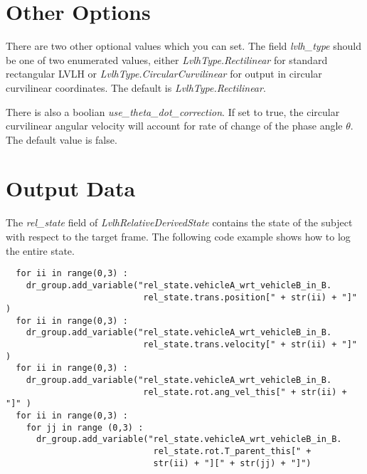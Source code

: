 \section{Other Options}
There are two other optional values which you can set. The field
\textit{lvlh\_type} should be one of two enumerated values, either
\textit{LvlhType.Rectilinear} for standard rectangular LVLH or
\textit{LvlhType.CircularCurvilinear} for output in circular curvilinear
coordinates. The default is \textit{LvlhType.Rectilinear}.

There is also a boolian \textit{use\_theta\_dot\_correction}. If set to true,
the circular curvilinear angular velocity will account for rate of change of
the phase angle $\theta$. The default value is false.
\section{Output Data}
The \textit{rel\_state} field of \textit{LvlhRelativeDerivedState} contains
the state of the subject with respect to the target frame. The following code
example shows how to log the entire state.
\begin{verbatim}
  for ii in range(0,3) :
    dr_group.add_variable("rel_state.vehicleA_wrt_vehicleB_in_B.
                           rel_state.trans.position[" + str(ii) + "]" )
  for ii in range(0,3) :
    dr_group.add_variable("rel_state.vehicleA_wrt_vehicleB_in_B.
                           rel_state.trans.velocity[" + str(ii) + "]" )
  for ii in range(0,3) :
    dr_group.add_variable("rel_state.vehicleA_wrt_vehicleB_in_B.
                           rel_state.rot.ang_vel_this[" + str(ii) + "]" )
  for ii in range(0,3) :
    for jj in range (0,3) :
      dr_group.add_variable("rel_state.vehicleA_wrt_vehicleB_in_B.
                             rel_state.rot.T_parent_this[" +
                             str(ii) + "][" + str(jj) + "]")
\end{verbatim}
